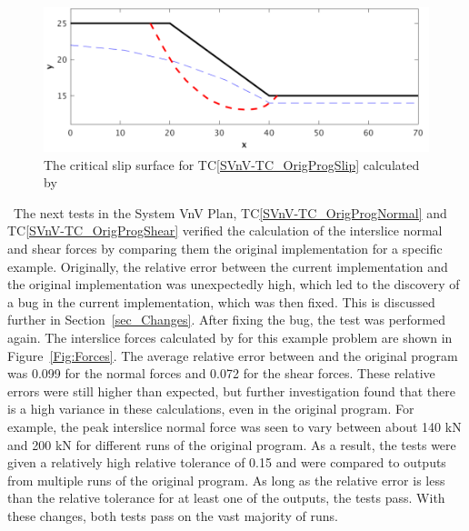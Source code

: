 \documentclass[12pt, titlepage]{article}
\newcommand{\tcref}[1]{TC\ref{#1}}
\begin{document}
\begin{figure}[h!]
	\begin{center}
		\includegraphics[width=1.0\textwidth]{Slip.png}
		\caption{The critical slip surface for \tcref{SVnV-TC_OrigProgSlip} 
			calculated by \progname{}}
		\label{Fig:Slip}
	\end{center}
\end{figure}

~\newline \noindent The next tests in the System VnV Plan, 
\tcref{SVnV-TC_OrigProgNormal} 
and \tcref{SVnV-TC_OrigProgShear} verified the calculation of the interslice 
normal and shear forces by comparing them the original implementation for a 
specific example. Originally, the relative error between the current 
implementation and the original implementation was unexpectedly high, which led 
to the discovery of a bug in the current implementation, which was then fixed. 
This is discussed further in Section~\ref{sec_Changes}. After fixing the bug, 
the test was performed again. The interslice forces calculated by \progname for 
this example problem are shown in Figure~\ref{Fig:Forces}. The average relative 
error between \progname and the original program was 0.099 for the normal 
forces and 0.072 for the shear forces. These relative errors were still higher 
than expected, but further investigation found that there is a high variance in 
these calculations, even in the original program. For example, the peak 
interslice normal force was seen to vary between about 140 \si{\kilo\newton} 
and 200 \si{\kilo\newton} for different runs of the original program. As a 
result, the tests were given a relatively high relative tolerance of 0.15 and 
were compared to outputs from multiple runs of the original program. As long as 
the relative error is less than the relative tolerance for at least one of the 
outputs, the tests pass. With these changes, both tests pass on the vast 
majority of runs.
\end{document}
